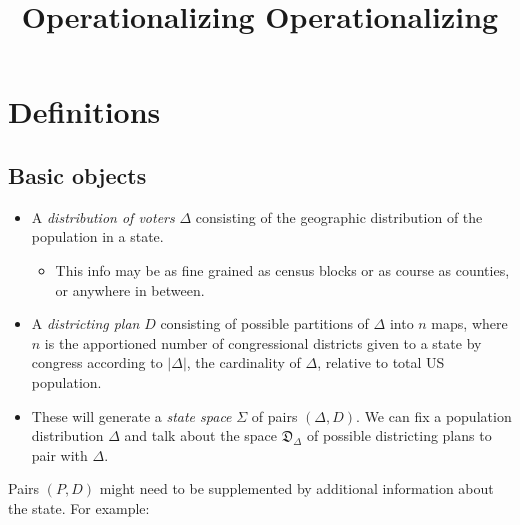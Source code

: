 \documentclass{article}
\title{Operationalizing Operationalizing}
\date{ }
\newcommand{\Dd}{\mathfrak{D}_\Delta}
\begin{document}
\maketitle

\section{Definitions}

\subsection{Basic objects}

\begin{itemize}
    \item A \textit{distribution of voters} $\Delta$ consisting of the geographic distribution of the population in a state.
    \begin{itemize}
        \item This info may be as fine grained as census blocks or as course as counties, or anywhere in between.
    \end{itemize}
    \item A \textit{districting plan} $D$ consisting of possible partitions of $\Delta$ into $n$ maps, where $n$ is the apportioned number of congressional districts given to a state by congress according to $|\Delta|$, the cardinality of $\Delta$, relative to total US population.
    \item These will generate a \textit{state space} $\Sigma$ of pairs $(\Delta, D)$. We can fix a population distribution $\Delta$ and talk about the space $\Dd$ of possible districting plans to pair with $\Delta$.
\end{itemize}


Pairs $(P, D)$ might need to be supplemented by additional information about the state. For example:
\end{document}

